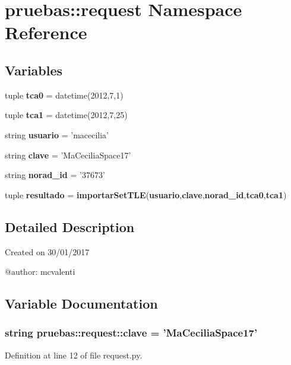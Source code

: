\section{pruebas\-:\-:request \-Namespace \-Reference}
\label{namespacepruebas_1_1request}
\subsection*{\-Variables}
\begin{DoxyCompactItemize}
\item 
tuple {\bf tca0} = datetime(2012,7,1)
\item 
tuple {\bf tca1} = datetime(2012,7,25)
\item 
string {\bf usuario} = 'macecilia'
\item 
string {\bf clave} = '\-Ma\-Cecilia\-Space17'
\item 
string {\bf norad\-\_\-id} = '37673'
\item 
tuple {\bf resultado} = {\bf importar\-Set\-T\-L\-E}({\bf usuario},{\bf clave},{\bf norad\-\_\-id},{\bf tca0},{\bf tca1})
\end{DoxyCompactItemize}


\subsection{\-Detailed \-Description}
\begin{DoxyVerb}
Created on 30/01/2017

@author: mcvalenti
\end{DoxyVerb}
 

\subsection{\-Variable \-Documentation}
\subsubsection[{clave}]{\setlength{\rightskip}{0pt plus 5cm}string {\bf pruebas\-::request\-::clave} = '\-Ma\-Cecilia\-Space17'}\label{namespacepruebas_1_1request_aa7f819a84db7c53517820d4eeb7d597e}


\-Definition at line 12 of file request.\-py.

